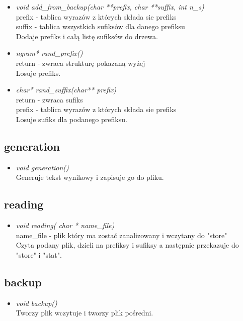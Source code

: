 \documentclass[12pt,a4paper]{report}
\begin{document}
\begin{itemize}
			\item \textit{void add\_from\_backup(char **prefix, char **suffix, int n\_s)} \\
			prefix - tablica wyrazów z których składa sie prefiks \\
			suffix - tablica wszystkich sufiksów dla danego prefiksu \\			
			Dodaje prefiks i całą listę sufiksów do drzewa.
			
			\item \textit{ngram* rand\_prefix()} \\
			return - zwraca strukturę pokazaną wyżej\\
			Losuje prefiks.
			
			\item \textit{char* rand\_suffix(char** prefix)}\\
			return - zwraca sufiks \\
			prefix - tablica wyrazów z których składa sie prefiks \\ 
			Losuje sufiks dla podanego prefiksu.
			
		\end{itemize}
	
	\subsection*{generation} 
		\begin{itemize}
			
			\item \textit{void generation()}\\
			Generuje tekst wynikowy i zapisuje go do pliku.
			
		\end{itemize}
	
	\subsection*{reading} 
		\begin{itemize}
			
			\item \textit{void reading( char * name\_file)}\\
			 name\_file - plik który ma zostać zanalizowany i wczytany do "store" \\
			Czyta podany plik, dzieli na prefiksy i sufiksy a następnie przekazuje do "store" i "stat".
			
		\end{itemize}
	
	\subsection*{backup} 
		\begin{itemize}
			
			\item \textit{void backup()}\\
			Tworzy plik wczytuje i tworzy plik pośredni.
			
		\end{itemize}
\end{document}
